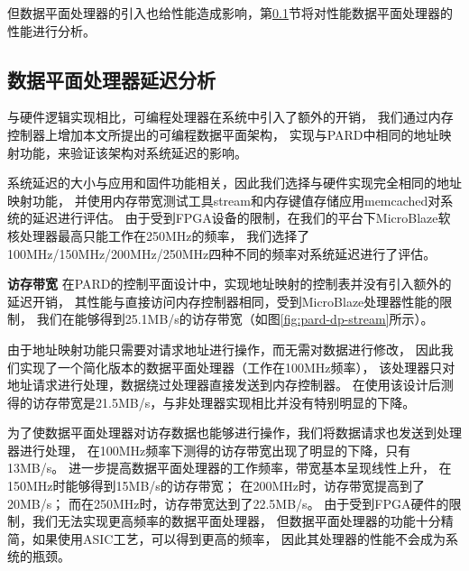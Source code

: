 但数据平面处理器的引入也给性能造成影响，第\ref{chap:impl:dp-latency}节将对性能数据平面处理器的性能进行分析。


%

\subsection{数据平面处理器延迟分析}
\label{chap:impl:dp-latency}


与硬件逻辑实现相比，可编程处理器在系统中引入了额外的开销，
我们通过内存控制器上增加本文所提出的可编程数据平面架构，
实现与PARD中相同的地址映射功能，来验证该架构对系统延迟的影响。

系统延迟的大小与应用和固件功能相关，因此我们选择与硬件实现完全相同的地址映射功能，
并使用内存带宽测试工具stream和内存键值存储应用memcached对系统的延迟进行评估。
由于受到FPGA设备的限制，在我们的平台下MicroBlaze软核处理器最高只能工作在250MHz的频率，
我们选择了100MHz/150MHz/200MHz/250MHz四种不同的频率对系统延迟进行了评估。

\textbf{访存带宽}\quad
在PARD的控制平面设计中，实现地址映射的控制表并没有引入额外的延迟开销，
其性能与直接访问内存控制器相同，受到MicroBlaze处理器性能的限制，
我们在能够得到25.1MB/s的访存带宽（如图\ref{fig:pard-dp-stream}所示）。

由于地址映射功能只需要对请求地址进行操作，而无需对数据进行修改，
因此我们实现了一个简化版本的数据平面处理器（工作在100MHz频率），
该处理器只对地址请求进行处理，数据绕过处理器直接发送到内存控制器。
在使用该设计后测得的访存带宽是21.5MB/s，与非处理器实现相比并没有特别明显的下降。

为了使数据平面处理器对访存数据也能够进行操作，我们将数据请求也发送到处理器进行处理，
在100MHz频率下测得的访存带宽出现了明显的下降，只有13MB/s。
进一步提高数据平面处理器的工作频率，带宽基本呈现线性上升，
在150MHz时能够得到15MB/s的访存带宽；
在200MHz时，访存带宽提高到了20MB/s；
而在250MHz时，访存带宽达到了22.5MB/s。
由于受到FPGA硬件的限制，我们无法实现更高频率的数据平面处理器，
但数据平面处理器的功能十分精简，如果使用ASIC工艺，可以得到更高的频率，
因此其处理器的性能不会成为系统的瓶颈。

